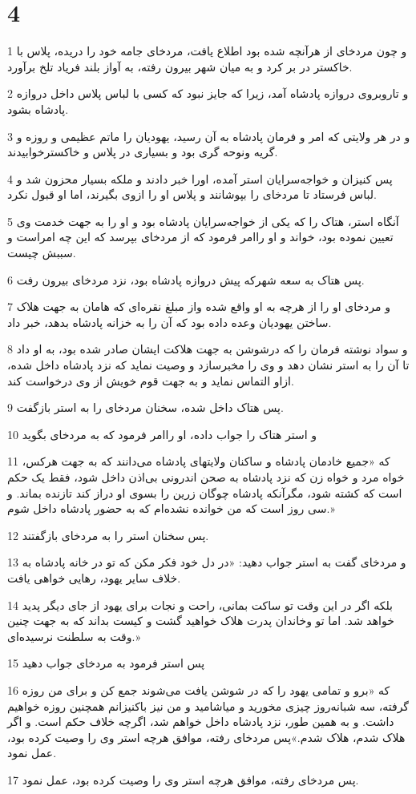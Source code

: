 \chapter{4}

\par 1 و چون مردخای از هرآنچه شده بود اطلاع یافت، مردخای جامه خود را دریده، پلاس با خاکستر در بر کرد و به میان شهر بیرون رفته، به آواز بلند فریاد تلخ برآورد.
\par 2 و تاروبروی دروازه پادشاه آمد، زیرا که جایز نبود که کسی با لباس پلاس داخل دروازه پادشاه بشود.
\par 3 و در هر ولایتی که امر و فرمان پادشاه به آن رسید، یهودیان را ماتم عظیمی و روزه و گریه ونوحه گری بود و بسیاری در پلاس و خاکسترخوابیدند. 
\par 4 پس کنیزان و خواجه‌سرایان استر آمده، اورا خبر دادند و ملکه بسیار محزون شد و لباس فرستاد تا مردخای را بپوشانند و پلاس او را ازوی بگیرند، اما او قبول نکرد.
\par 5 آنگاه استر، هتاک را که یکی از خواجه‌سرایان پادشاه بود و او را به جهت خدمت وی تعیین نموده بود، خواند و او راامر فرمود که از مردخای بپرسد که این چه امراست و سببش چیست.
\par 6 پس هتاک به سعه شهرکه پیش دروازه پادشاه بود، نزد مردخای بیرون رفت.
\par 7 و مردخای او را از هرچه به او واقع شده واز مبلغ نقره‌ای که هامان به جهت هلاک ساختن یهودیان وعده داده بود که آن را به خزانه پادشاه بدهد، خبر داد.
\par 8 و سواد نوشته فرمان را که درشوشن به جهت هلاکت ایشان صادر شده بود، به او داد تا آن را به استر نشان دهد و وی را مخبرسازد و وصیت نماید که نزد پادشاه داخل شده، ازاو التماس نماید و به جهت قوم خویش از وی درخواست کند.
\par 9 پس هتاک داخل شده، سخنان مردخای را به استر بازگفت.
\par 10 و استر هتاک را جواب داده، او راامر فرمود که به مردخای بگوید
\par 11 که «جمیع خادمان پادشاه و ساکنان ولایتهای پادشاه می‌دانند که به جهت هرکس، خواه مرد و خواه زن که نزد پادشاه به صحن اندرونی بی‌اذن داخل شود، فقط یک حکم است که کشته شود، مگرآنکه پادشاه چوگان زرین را بسوی او دراز کند تازنده بماند. و سی روز است که من خوانده نشده‌ام که به حضور پادشاه داخل شوم.»
\par 12 پس سخنان استر را به مردخای باز‌گفتند.
\par 13 و مردخای گفت به استر جواب دهید: «در دل خود فکر مکن که تو در خانه پادشاه به خلاف سایر یهود، رهایی خواهی یافت.
\par 14 بلکه اگر در این وقت تو ساکت بمانی، راحت و نجات برای یهود از جای دیگر پدید خواهد شد. اما تو وخاندان پدرت هلاک خواهید گشت و کیست بداند که به جهت چنین وقت به سلطنت نرسیده‌ای.»
\par 15 پس استر فرمود به مردخای جواب دهید
\par 16 که «برو و تمامی یهود را که در شوشن یافت می‌شوند جمع کن و برای من روزه گرفته، سه شبانه‌روز چیزی مخورید و میاشامید و من نیز باکنیزانم همچنین روزه خواهیم داشت. و به همین طور، نزد پادشاه داخل خواهم شد، اگر‌چه خلاف حکم است. و اگر هلاک شدم، هلاک شدم.»پس مردخای رفته، موافق هرچه استر وی را وصیت کرده بود، عمل نمود.
\par 17 پس مردخای رفته، موافق هرچه استر وی را وصیت کرده بود، عمل نمود.
 

